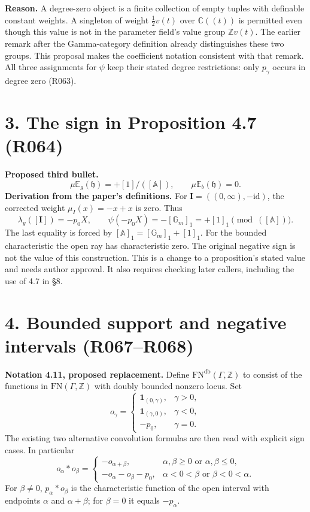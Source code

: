 \documentclass[11pt]{article}
\newcommand{\FN}{\mathrm{FN}}
\newcommand{\Gm}{\mathbb G_m}
\begin{document}
\noindent\textbf{Reason.} A degree-zero object is a finite collection of
empty tuples with definable constant weights. A singleton of weight
$\tfrac12 v(t)$ over $\mathbb C((t))$ is permitted even though this value
is not in the parameter field's value group $\mathbb Z v(t)$.
The earlier remark after the Gamma-category definition already distinguishes
these two groups. This proposal makes the coefficient notation consistent
with that remark. All three assignments for $\psi$ keep their stated
degree restrictions: only $p_\gamma$ occurs in degree zero (R063).

\section*{3. The sign in Proposition 4.7 (R064)}
\textbf{Proposed third bullet.}
\[
 \mu\mathbb E_g(\mathfrak h)=+[1]/([\mathbb A]),
 \qquad \mu\mathbb E_b(\mathfrak h)=0.
\]
\textbf{Derivation from the paper's definitions.} For
$\boldsymbol I=((0,\infty),-\mathrm{id})$, the corrected weight
$\mu_I(x)=-x+x$ is zero. Thus
\[
 \lambda_g([\boldsymbol I])=-p_0X,
 \qquad \psi(-p_0X)=-[\Gm]_1=+[1]_1
       \pmod{([\mathbb A])}.
\]
The last equality is forced by $[\mathbb A]_1=[\Gm]_1+[1]_1$.
For the bounded characteristic the open ray has characteristic zero.
The original negative sign is not the value of this construction.
This is a change to a proposition's stated value and needs author approval.
It also requires checking later callers, including the use of 4.7 in \S8.

\section*{4. Bounded support and negative intervals (R067--R068)}
\textbf{Notation 4.11, proposed replacement.}
Define $\FN^{\mathrm{db}}(\Gamma,\mathbb Z)$ to consist of the functions
in $\FN(\Gamma,\mathbb Z)$ with doubly bounded nonzero locus. Set
\[
 o_\gamma=\begin{cases}
 \mathbf1_{(0,\gamma)},&\gamma>0,\\
 \mathbf1_{(\gamma,0)},&\gamma<0,\\
 -p_0,&\gamma=0.
 \end{cases}
\]
The existing two alternative convolution formulas are then read with
explicit sign cases. In particular
\[
 o_\alpha*o_\beta=
 \begin{cases}
 -o_{\alpha+\beta},&\alpha,\beta\geq0\text{ or }\alpha,\beta\leq0,\\
 -o_\alpha-o_\beta-p_0,&\alpha<0<\beta\text{ or }\beta<0<\alpha.
 \end{cases}
\]
For $\beta\ne0$, $p_\alpha*o_\beta$ is the characteristic function
of the open interval with endpoints $\alpha$ and $\alpha+\beta$;
for $\beta=0$ it equals $-p_\alpha$.
\end{document}
